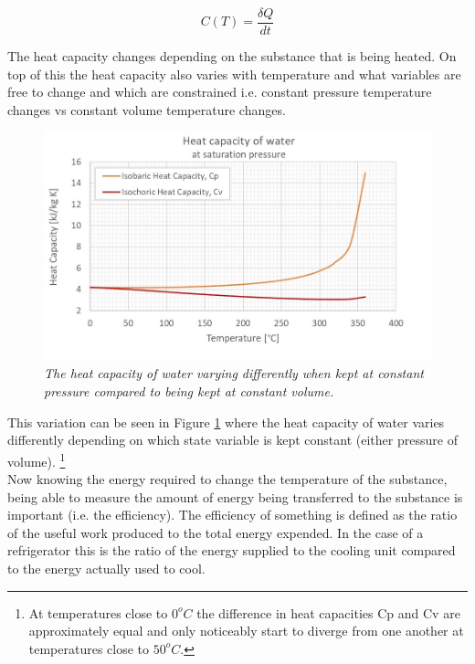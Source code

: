 \documentclass[10pt]{article}
\begin{document}
\begin{equation}\label{eq:heat_cap}
    C(T) = \frac{\delta Q}{dt}
\end{equation}

The heat capacity changes depending on the substance that is being heated. On top of this the heat capacity also varies with temperature and what variables are free to change and which are constrained i.e. constant pressure temperature changes vs constant volume temperature changes. 

\begin{figure}[h!]
    \centering
    \includegraphics[scale=1.0]{Heat_capacity_C.jpg}
    \caption{\it{The heat capacity of water varying differently when kept at constant pressure compared to being kept at constant volume\cite{heat_cap}.}}
    \label{fig:heat_cap_water}
\end{figure}

This variation can be seen in Figure \ref{fig:heat_cap_water} where the heat capacity of water varies differently depending on which state variable is kept constant (either pressure of volume). \footnote{At temperatures close to $0^oC$ the difference in heat capacities Cp and Cv are approximately equal and only noticeably start to diverge from one another at temperatures close to $50^oC$.}\\

Now knowing the energy required to change the temperature of the substance, being able to measure the amount of energy being transferred to the substance is important (i.e. the efficiency). The efficiency of something is defined as the ratio of the useful work produced to the total energy expended. In the case of a refrigerator this is the ratio of the energy supplied to the cooling unit compared to the energy actually used to cool.\\
\end{document}
